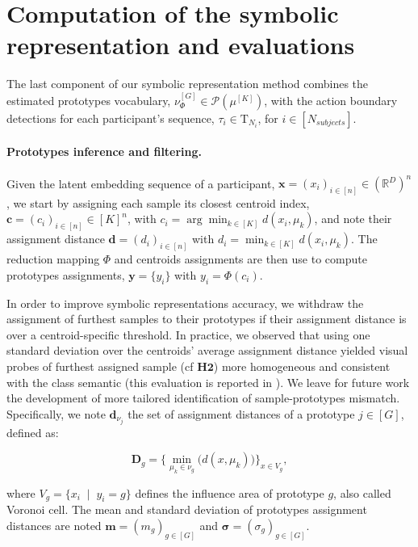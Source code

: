\section{Computation of the symbolic representation and evaluations}
    \label{sec:chapter_5_symbolic_representation}


    The last component of our symbolic representation method combines the estimated prototypes vocabulary, $\nu^{[G]}_\Phi \in \mathcal{P}(\mu^{[K]})$, with the action boundary detections for each participant's sequence, $\tau_{i} \in \mathrm{T}_{N_i}$, for $i\in [N_{subjects}]$.


    \paragraph{Prototypes inference and filtering.\\}


    Given the latent embedding sequence of a participant, $\textbf{x} = (x_i)_{i \in [n]} \in (\mathbb{R}^D)^n$, we start by assigning each sample its closest centroid index, $\mathbf{c} = (c_i)_{i \in [n]} \in [K]^n$, with $c_i= \arg \min_{k \in [K]}  d(x_i, \mu_k)$, and note their assignment distance $\mathbf{d} = (d_i)_{i \in [n]}$ with $d_i =  \min_{k \in [K]}  d(x_i, \mu_k)$. The reduction mapping $\Phi$ and centroids assignments are then use to compute prototypes assignments, $\mathbf{y} = \{ y_i \}$ with $y_i = \Phi(c_i)$.
    
    In order to improve symbolic representations accuracy, we withdraw the assignment of furthest samples to their prototypes if their assignment distance is over a centroid-specific threshold. In practice, we observed that using one standard deviation over the centroids' average assignment distance yielded visual probes of furthest assigned sample (cf $\mathbf{H2}$) more homogeneous and consistent with the class semantic (this evaluation is reported in ). We leave for future work the development of more tailored identification of sample-prototypes mismatch. Specifically, we note $\textbf{d}_{\nu_j}$ the set of assignment distances of a prototype $j\in [G]$, defined as:

    $$\textbf{D}_{g} = \{ \min_{\mu_k \in \nu_g} \big( d(x, \mu_k)\big) \}_{x \in V_g},$$
    
    where $V_g = \{x_i \;\mid\; y_i = g \}$ defines the influence area of prototype $g$, also called Voronoi cell. The mean and standard deviation of prototypes assignment distances are noted $\textbf{m} = (m_g)_{g \in [G]}$ and $\mathbf{\sigma} = (\sigma_g)_{g \in [G]}$. %

